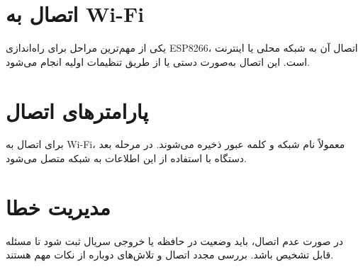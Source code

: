 \section{اتصال به Wi-Fi}

یکی از مهم‌ترین مراحل برای راه‌اندازی ESP8266، اتصال آن به شبکه محلی یا اینترنت است. این اتصال به‌صورت دستی یا از طریق تنظیمات اولیه انجام می‌شود.

\section{پارامترهای اتصال}

برای اتصال به Wi-Fi، معمولاً نام شبکه و کلمه عبور ذخیره می‌شوند. در مرحله بعد دستگاه با استفاده از این اطلاعات به شبکه متصل می‌شود.

\section{مدیریت خطا}

در صورت عدم اتصال، باید وضعیت در حافظه یا خروجی سریال ثبت شود تا مسئله قابل تشخیص باشد. بررسی مجدد اتصال و تلاش‌های دوباره از نکات مهم هستند.
